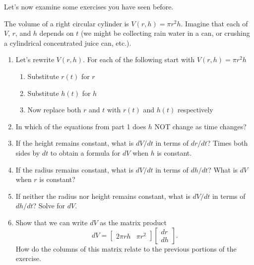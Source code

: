 Let's now examine some exercises you have seen before. 
\begin{problem}\label{prob:differential volume of a cylinder}%
%
 The volume of a right circular cylinder is $V(r,h)= \pi r^2 h$.  Imagine that each of $V$, $r$, and $h$ depends on $t$ (we might be collecting rain water in a can, or crushing a cylindrical concentrated juice can, etc.).  
\begin{enumerate}
	\item Let's rewrite $V(r,h)$. For each of the following start with $V(r,h)=\pi r^2 h$
	\begin{enumerate}
		\item Substitute $r(t)$ for $r$
		\item Substitute $h(t)$ for $h$
		\item Now replace both $r$ and $t$ with $r(t)$ and $h(t)$ respectively
	\end{enumerate}
	\item In which of the equations from part 1 does $h$ NOT change as time changes?
	\item If the height remains constant, what is $dV/dt$ in terms of $dr/dt$? Times both sides by $dt$ to obtain a formula for $dV$ when $h$ is constant.
	\item If the radius remains constant, what is $dV/dt$ in terms of $dh/dt$? What is $dV$ when $r$ is constant?
	\item If neither the radius nor height remains constant, what is $dV/dt$ in terms of $dh/dt$? Solve for $dV$.
	\item%
%
Show that we can write $dV$ as the matrix product 
$$dV = \begin{bmatrix}2\pi rh& \pi r^2\end{bmatrix}\begin{bmatrix}dr\\dh\end{bmatrix}.$$ 
How do the columns of this matrix relate to the previous portions of the exercise.
\end{enumerate}
\end{problem}


